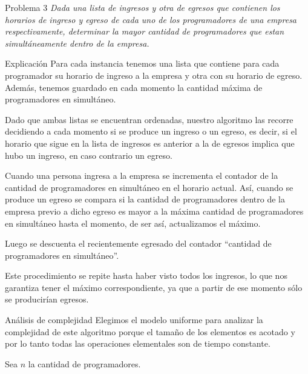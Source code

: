 \begin{section}{Problema 3}
	\textit{Dada una lista de ingresos y otra de egresos que contienen los horarios de ingreso y egreso de cada uno de los programadores de una empresa respectivamente, determinar la mayor cantidad de programadores que estan simultáneamente dentro de la empresa.}
	\begin{subsection}{Explicación}
		Para cada instancia tenemos una lista que contiene para cada programador su horario de ingreso a la empresa y otra con su horario de egreso. Además, tenemos guardado en cada momento la cantidad máxima de programadores en simultáneo.

Dado que ambas listas se encuentran ordenadas, nuestro algoritmo las recorre decidiendo a cada momento si se produce un ingreso o un egreso, es decir, si el horario que sigue en la lista de ingresos es anterior a la de egresos implica que hubo un ingreso, en caso contrario un egreso.

Cuando una persona ingresa a la empresa se incrementa el contador de la cantidad de programadores en simultáneo en el horario actual. Así, cuando se produce un egreso se compara si la cantidad de programadores dentro de la empresa previo a dicho egreso es mayor a la máxima cantidad de programadores en simultáneo hasta el momento, de ser así, actualizamos el máximo.

Luego se descuenta el recientemente egresado del contador ``cantidad de programadores en simultáneo''.

Este procedimiento se repite hasta haber visto todos los ingresos, lo que nos garantiza tener el máximo correspondiente, ya que a partir de ese momento sólo se producirían egresos.

		\begin{subsubsection}{Análisis de complejidad}
			Elegimos el modelo uniforme para analizar la complejidad de este algoritmo porque el tamaño de los elementos es acotado y por lo tanto todas las operaciones elementales son de tiempo constante.
			
			Sea $n$ la cantidad de programadores.\\
			

\end{subsubsection}
\end{subsection}
\end{section}
